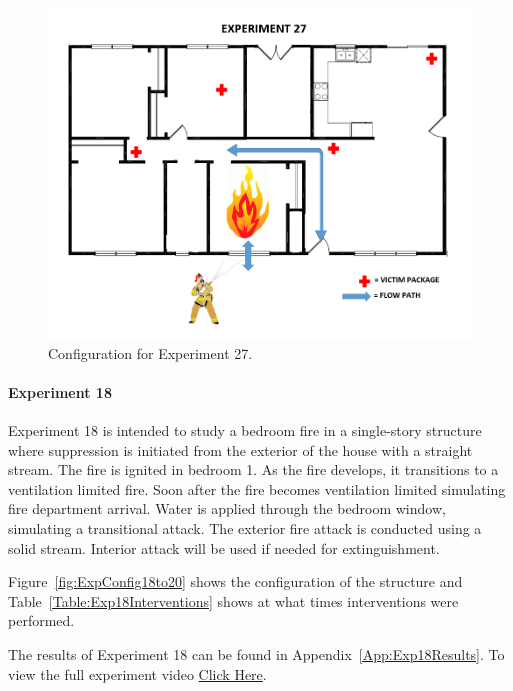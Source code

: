 \documentclass[12pt,oneside]{book}
\begin{document}
\begin{figure}[H]
	\centering
	\includegraphics[width=5in]{Figures/General/Exp27.png}
	\caption{Configuration for Experiment 27.}
	\label{fig:ExpConfig27}
\end{figure}

\clearpage

\paragraph{Experiment 18} \mbox{}

Experiment 18 is intended to study a bedroom fire in a single-story structure where suppression is initiated from the exterior of the house with a straight stream. The fire is ignited in bedroom 1. As the fire develops, it transitions to a ventilation limited fire. Soon after the fire becomes ventilation limited simulating fire department arrival. Water is applied through the bedroom window, simulating a transitional attack. The exterior fire attack is conducted using a solid stream. Interior attack will be used if needed for extinguishment. 

Figure~\ref{fig:ExpConfig18to20} shows the configuration of the structure and Table~\ref{Table:Exp18Interventions} shows at what times interventions were performed. 

The results of Experiment 18 can be found in Appendix~\ref{App:Exp18Results}. To view the full experiment video \href{https://youtu.be/gl8rc1Nsl1k}{Click Here}.
\end{document}
